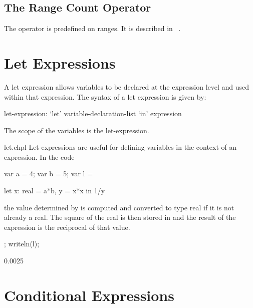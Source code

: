 \subsection{The Range Count Operator}
\label{The_Range_Count_Operator}

The operator \chpl{#} is predefined on ranges. It is described
in ~.

\section{Let Expressions}
\label{Let_Expressions}

A let expression allows variables to be declared at the expression
level and used within that expression.  The syntax of a let expression
is given by:
\begin{syntax}
let-expression:
  `let' variable-declaration-list `in' expression
\end{syntax}
The scope of the variables is the let-expression.
\begin{chapelexample}{let.chpl}
Let expressions are useful for defining variables in the context of
an expression.  In the code
\begin{chapelnoprint}
  var a = 4;
  var b = 5;
  var l =
\end{chapelnoprint}
\begin{chapel}
  let x: real = a*b, y = x*x in 1/y
\end{chapel}
the value determined by  is computed and converted to type
real if it is not already a real.  The square of the real is then
stored in  and the result of the expression is the reciprocal
of that value.
\begin{chapelnoprint}
  ;
  writeln(l);
\end{chapelnoprint}
\begin{chapeloutput}
0.0025
\end{chapeloutput}
\end{chapelexample}

\section{Conditional Expressions}
\label{Conditional_Expressions}

